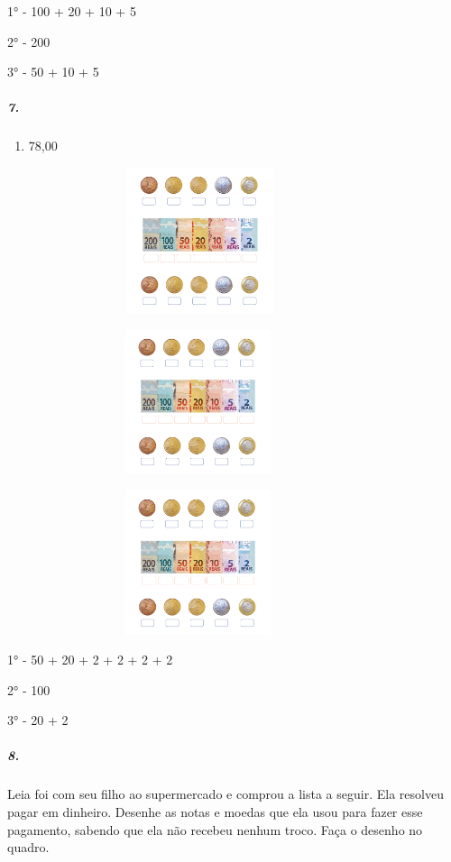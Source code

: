 1° - 100 + 20 + 10 + 5

2° - 200

3° - 50 + 10 + 5

\subparagraph{7.}\label{section-60}

\begin{enumerate}
\def\labelenumi{\alph{enumi})}
\item
  78,00
\end{enumerate}

\includegraphics[width=4.45833in,height=1.68116in]{media/image72.png}

\includegraphics[width=4.40625in,height=1.66152in]{media/image72.png}

\includegraphics[width=4.40625in,height=1.66152in]{media/image72.png}

1° - 50 + 20 + 2 + 2 + 2 + 2

2° - 100

3° - 20 + 2


\subparagraph{8.}\label{section-62}

Leia foi com seu filho ao supermercado e comprou a lista a seguir. Ela
resolveu pagar em dinheiro. Desenhe as notas e moedas que ela usou para
fazer esse pagamento, sabendo que ela não recebeu nenhum troco. Faça o
desenho no quadro.

